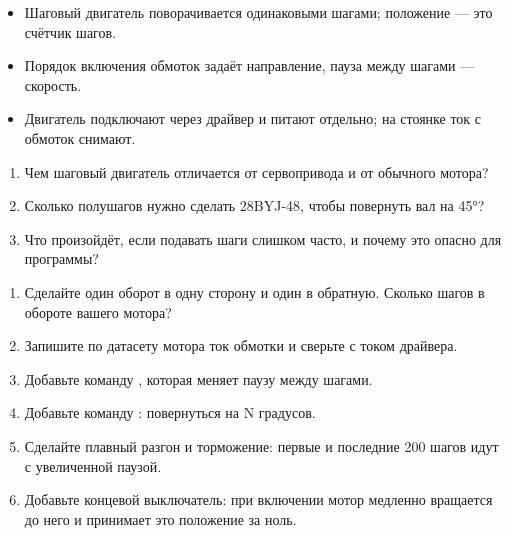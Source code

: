 \begin{summary}
\begin{itemize}[leftmargin=*]
  \item Шаговый двигатель поворачивается одинаковыми шагами; положение --- это счётчик шагов.
  \item Порядок включения обмоток задаёт направление, пауза между шагами --- скорость.
  \item Двигатель подключают через драйвер и питают отдельно; на стоянке ток с обмоток снимают.
\end{itemize}
\end{summary}

\begin{selfcheck}
\begin{enumerate}
  \item Чем шаговый двигатель отличается от сервопривода и от обычного мотора?
  \item Сколько полушагов нужно сделать 28BYJ-48, чтобы повернуть вал на 45°?
  \item Что произойдёт, если подавать шаги слишком часто, и почему это опасно для программы?
\end{enumerate}
\end{selfcheck}

\begin{tasks}
\begin{enumerate}
\item {} Сделайте один оборот в одну сторону и один в обратную. Сколько шагов в обороте вашего мотора?
\item {} Запишите по датасету мотора ток обмотки и сверьте с током драйвера.
\item {} Добавьте команду , которая меняет паузу между шагами.
\item {} Добавьте команду : повернуться на N градусов.
\item {} Сделайте плавный разгон и торможение: первые и последние 200 шагов идут с увеличенной паузой.
\item {} Добавьте концевой выключатель: при включении мотор медленно вращается до него и принимает это положение за ноль.
\end{enumerate}
\end{tasks}
